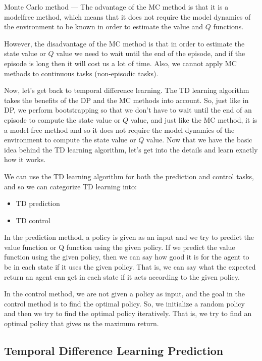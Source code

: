 Monte Carlo method — The advantage of the MC method is that it is a 
modelfree method, which means that it does not require the model dynamics 
of the environment to be known in order to estimate the value and $Q$ 
functions.  

However, the disadvantage of the MC method is that in order to estimate the 
state value or $Q$ value we need to wait until the end of the episode, and 
if the episode is long then it will cost us a lot of time. Also, we cannot 
apply MC methods to continuous tasks (non-episodic tasks).  

Now, let's get back to temporal difference learning. The TD learning 
algorithm takes the benefits of the DP and the MC methods into account. So, 
just like in DP, we perform bootstrapping so that we don't have to wait 
until the end of an episode to compute the state value or $Q$ value, and 
just like the MC method, it is a model-free method and so it does not 
require the model dynamics of the environment to compute the state value 
or $Q$ value. Now that we have the basic idea behind the TD learning 
algorithm, let's get into the details and learn exactly how it works. 

We can use the TD learning algorithm for both the prediction and control 
tasks, and so we can categorize TD learning into:  
\begin{itemize}
\item
TD prediction

\item
TD control
\end{itemize}

In the prediction method, a policy is given as an input and we try to 
predict the value function or Q function using the given policy. If we 
predict the value function using the given policy, then we can say how good 
it is for the agent to be in each state if it uses the given policy. That 
is, we can say what the expected return an agent can get in each state if 
it acts according to the given policy.  

In the control method, we are not given a policy as input, and the goal in 
the control method is to find the optimal policy. So, we initialize a 
random policy and then we try to find the optimal policy iteratively. That 
is, we try to find an optimal policy that gives us the maximum return.  

\subsection{Temporal Difference Learning Prediction}

